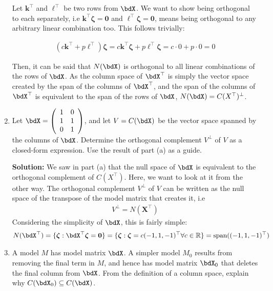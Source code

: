 \begin{enumerate}
\begin{hwanswer}
Let $\bm k^\top$ and $\bm \ell^\top$ be two rows from $\bdX$. We want to show being orthogonal to each separately, i.e $\bm k^\top \bm \zeta =\bm 0$ and $\bm \ell^\top \bm \zeta =\bm 0$, means being orthogonal to any arbitrary linear combination too. This follows trivially: 

\begin{align*}
	(c \bm k^\top+p\bm \ell^\top)\bm \zeta = c\bm k^\top \bm \zeta + p \bm \ell ^\top \bm \zeta = c \cdot 0 + p \cdot 0 = 0
\end{align*}

Then, it can be said that $N(\bdX)$ is orthogonal to all linear combinations of the rows of $\bdX$. As the column space of $\bdX^\top$ is simply the vector space created by the span of the columns of $\bdX^\top$, and the span of the columns of $\bdX^\top$ is equivalent to the span of the rows of $\bdX$, $N(\bdX) = C(X^\top)^\bot$.
\end{hwanswer}
\item Let $\bdX =
\left( \begin{array}{rl} 1 & 0 \\ 1 & 1 \\ 0 & 1 \end{array} \right)$,
and let $V = C(\bdX)$ be the vector space spanned by the columns of
$\bdX$.
Determine the orthogonal complement $V^\perp$ of $V$ as a closed-form
expression.
Use the result of part (a) as a guide.\\
\begin{hwanswer}
	\textbf{Solution:} We saw in part (a) that the null space of $\bdX$ is equivalent to the orthogonal complement of $C(X^\top)$. Here, we want to look at it from the other way. The orthogonal complement $V^\bot$ of $V$ can be written as the null space of the transpose of the model matrix that creates it, i.e 
\begin{align*}
	V^\bot = N(\bm X^\top)
\end{align*}
Considering the simplicity of $\bdX$, this is fairly simple: 
\begin{align*}
	N(\bdX^\top) = \{\bm \zeta : \bdX^\top \bm \zeta = \bm 0\} = \{\bm \zeta : \bm \zeta = c (-1,1,-1)^\top \forall c \in \mathbb R\} = \text{span}((-1,1,-1)^\top)
\end{align*}
\end{hwanswer}
\ee

\item 
A model $M$ has model matrix $\bdX$. 
A simpler model $M_0$ results from removing the final term in $M$, 
and hence has model matrix $\bdX_0$ that deletes the final column from
$\bdX$. 
From the definition of a column space, explain why 
$C(\bdX_0) \subseteq C(\bdX)$.


\end{enumerate}
